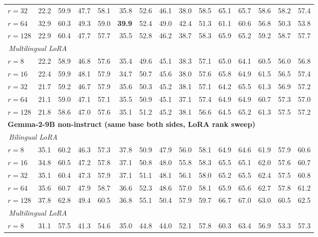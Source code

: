 \begin{table}[t]
\begin{tabular}{lrrrrrrrrrrrrrr}
\quad $r{=}32$ & 22.2 & 59.9 & 47.7 & 58.1 & 35.8 & 52.6 & 46.1 & 38.0 & 58.5 & 65.1 & 65.7 & 58.6 & 58.2 & 57.4 \\
\quad $r{=}64$ & 32.9 & 60.3 & 49.3 & 59.0 & \textbf{39.9} & 52.4 & 49.0 & 42.4 & 51.3 & 61.1 & 60.6 & 56.8 & 50.3 & 53.8 \\
\quad $r{=}128$ & 22.9 & 60.4 & 47.7 & 57.7 & 35.5 & 52.8 & 46.2 & 38.7 & 58.3 & 65.9 & 65.2 & 59.2 & 58.7 & 57.7 \\
\cmidrule(l){1-15}
\multicolumn{15}{l}{\textit{\,Multilingual LoRA}} \\
\quad $r{=}8$ & 22.2 & 58.9 & 46.8 & 57.6 & 35.4 & 49.6 & 45.1 & 38.3 & 57.1 & 65.0 & 64.1 & 60.5 & 56.0 & 56.8 \\
\quad $r{=}16$ & 22.4 & 59.9 & 48.1 & 57.9 & 34.7 & 50.7 & 45.6 & 38.0 & 57.6 & 65.8 & 64.9 & 61.5 & 56.5 & 57.4 \\
\quad $r{=}32$ & 21.7 & 59.2 & 46.7 & 57.9 & 35.6 & 50.3 & 45.2 & 38.1 & 57.1 & 64.2 & 65.5 & 61.3 & 56.9 & 57.2 \\
\quad $r{=}64$ & 21.1 & 59.0 & 47.1 & 57.1 & 35.5 & 50.9 & 45.1 & 37.1 & 57.4 & 64.9 & 64.9 & 60.7 & 57.3 & 57.0 \\
\quad $r{=}128$ & 21.8 & 58.6 & 47.0 & 57.6 & 35.1 & 51.2 & 45.2 & 38.1 & 56.6 & 64.5 & 65.2 & 61.3 & 57.5 & 57.2 \\
\midrule
\multicolumn{15}{l}{\textbf{Gemma-2-9B non-instruct (same base both sides, LoRA rank sweep)}} \\
\cmidrule(l){1-15}
\multicolumn{15}{l}{\textit{\,Bilingual LoRA}} \\
\quad $r{=}8$ & 35.1 & 60.2 & 46.3 & 57.3 & 37.8 & 50.9 & 47.9 & 56.0 & 58.1 & 64.9 & 64.6 & 61.9 & 57.9 & 60.6 \\
\quad $r{=}16$ & 34.8 & 60.5 & 47.2 & 57.8 & 37.1 & 50.8 & 48.0 & 55.8 & 58.3 & 65.5 & 65.1 & 62.0 & 57.6 & 60.7 \\
\quad $r{=}32$ & 35.1 & 60.4 & 47.3 & 57.9 & 37.1 & 51.1 & 48.1 & 56.1 & 58.0 & 65.2 & 65.5 & 62.4 & 57.5 & 60.8 \\
\quad $r{=}64$ & 35.6 & 60.7 & 47.9 & 58.7 & 36.6 & 52.3 & 48.6 & 57.0 & 58.1 & 65.9 & 65.6 & 62.7 & 57.8 & 61.2 \\
\quad $r{=}128$ & 37.8 & 62.8 & 49.4 & 60.5 & 36.8 & 55.1 & 50.4 & 57.9 & 59.7 & 66.7 & 67.0 & 63.0 & 60.5 & 62.5 \\
\cmidrule(l){1-15}
\multicolumn{15}{l}{\textit{\,Multilingual LoRA}} \\
\quad $r{=}8$ & 31.1 & 57.5 & 41.3 & 54.6 & 35.0 & 44.8 & 44.0 & 52.1 & 57.8 & 60.3 & 63.4 & 56.9 & 53.3 & 57.3 \\

\end{tabular}
\end{table}
